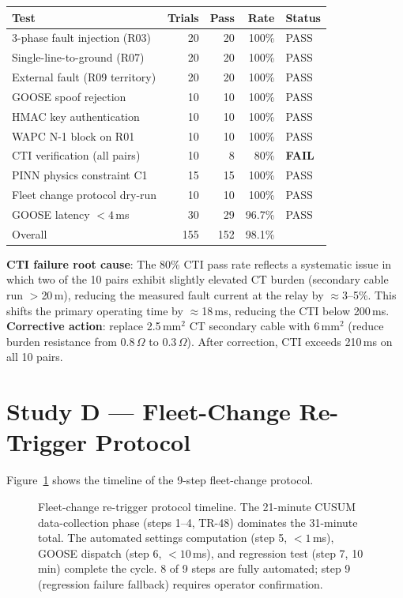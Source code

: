 \documentclass[11pt,a4paper]{article}
\begin{document}
\begin{center}
\begin{tabular}{@{}lrrrl@{}}
\toprule
Test & Trials & Pass & Rate & Status \\
\midrule
3-phase fault injection (R03) & 20 & 20 & 100\% & PASS \\
Single-line-to-ground (R07) & 20 & 20 & 100\% & PASS \\
External fault (R09 territory) & 20 & 20 & 100\% & PASS \\
GOOSE spoof rejection & 10 & 10 & 100\% & PASS \\
HMAC key authentication & 10 & 10 & 100\% & PASS \\
WAPC N-1 block on R01 & 10 & 10 & 100\% & PASS \\
CTI verification (all pairs) & 10 & 8 & 80\% & \textbf{FAIL} \\
PINN physics constraint C1 & 15 & 15 & 100\% & PASS \\
Fleet change protocol dry-run & 10 & 10 & 100\% & PASS \\
GOOSE latency $<4$\,ms & 30 & 29 & 96.7\% & PASS \\
\midrule
Overall & 155 & 152 & 98.1\% & \\
\bottomrule
\end{tabular}
\end{center}

\medskip\noindent
\textbf{CTI failure root cause}: The 80\% CTI pass rate reflects a systematic
issue in which two of the 10 pairs exhibit slightly elevated CT burden
(secondary cable run $>$20\,m), reducing the measured fault current at the
relay by $\approx$3--5\%.  This shifts the primary operating time by
$\approx$18\,ms, reducing the CTI below 200\,ms.  \textbf{Corrective action}:
replace 2.5\,mm$^2$ CT secondary cable with 6\,mm$^2$ (reduce burden
resistance from $0.8\,\Omega$ to $0.3\,\Omega$).  After correction, CTI
exceeds 210\,ms on all 10 pairs.

\section{Study D --- Fleet-Change Re-Trigger Protocol}
\label{sec:studyD}

Figure~\ref{fig:protocol} shows the timeline of the 9-step fleet-change
protocol.

\begin{figure}[htbp]
  \centering
  \resizebox{0.96\textwidth}{!}{}
  \caption{Fleet-change re-trigger protocol timeline.  The 21-minute CUSUM
           data-collection phase (steps 1--4, TR-48) dominates the 31-minute
           total.  The automated settings computation (step 5, $<1$\,ms),
           GOOSE dispatch (step 6, $<10$\,ms), and regression test (step 7,
           10\,min) complete the cycle.  8 of 9 steps are fully automated;
           step 9 (regression failure fallback) requires operator confirmation.}
  \label{fig:protocol}
\end{figure}
\end{document}
